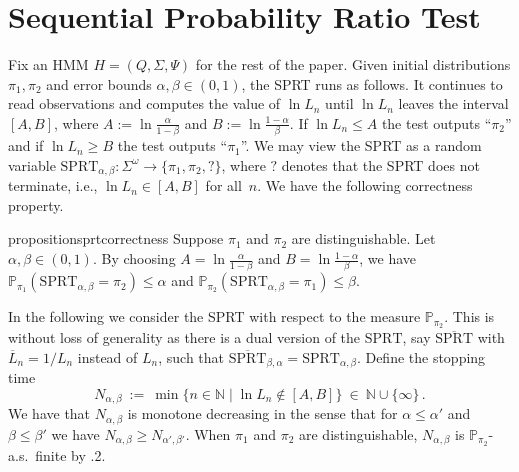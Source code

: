 \documentclass[a4paper,UKenglish,cleveref, autoref,mathscr]{lipics-v2019}
\newcommand{\NN}{\mathbb{N}}
\newcommand{\PP}{\mathbb{P}}
\newcommand{\1}{\mathbbm{1}}
\newcommand{\SPRT}{\mathrm{SPRT}}
\begin{document}
\section{Sequential Probability Ratio Test}\label{liexpsubsect}

Fix an HMM $H = (Q,\Sigma,\Psi)$ for the rest of the paper.
Given initial distributions $\pi_1, \pi_2$ and error bounds $\alpha, \beta \in (0,1)$, the SPRT runs as follows.
It continues to read observations and computes the value of $\ln L_n$ until $\ln L_n$ leaves the interval $[A,B]$, where $A := \ln \frac{\alpha}{1 - \beta}$ and $B := \ln \frac{1 - \alpha}{\beta}$.
If $\ln L_n \leq A$ the test outputs ``$\pi_2$'' and if $\ln L_n \geq B$ the test outputs ``$\pi_1$''.
We may view the SPRT as a random variable $\SPRT_{\alpha, \beta} : \Sigma^\omega \rightarrow \{\pi_1, \pi_2, ?\}$, where $?$ denotes that the SPRT does not terminate, i.e., $\ln L_n \in [A,B]$ for all~$n$.
We have the following correctness property.
\begin{restatable}{proposition}{sprtcorrectness}\label{sprtcorrectness}
Suppose $\pi_1$ and $\pi_2$ are distinguishable.
Let $\alpha, \beta \in (0,1)$.
By choosing $A = \ln \frac{\alpha}{1 - \beta}$ and $B = \ln \frac{1 - \alpha}{\beta}$, we have $\PP_{\pi_1} (\SPRT_{\alpha, \beta} = \pi_2) \leq \alpha$ and $\PP_{\pi_2} (\SPRT_{\alpha, \beta} = \pi_1) \leq \beta$.
\end{restatable}
In the following we consider the SPRT with respect to the measure $\PP_{\pi_2}$.
This is without loss of generality as there is a dual version of the $\SPRT$, say $\overline{\SPRT}$ with $\overline{L}_n = 1/L_n$ instead of $L_n$, such that $ \overline{\SPRT}_{\beta, \alpha} = \SPRT_{\alpha, \beta}$.
%
Define the stopping time
\begin{equation*}
N_{\alpha, \beta} \ := \ \min \{n \in \NN \mid \ln L_n \not\in [A, B]\} \ \in \ \NN \cup \{\infty\}\,.
\end{equation*}
We have that $N_{\alpha, \beta}$ is monotone decreasing in the sense that for $\alpha \leq \alpha'$ and $\beta \leq \beta'$ we have $N_{\alpha, \beta} \geq N_{\alpha', \beta'}$.
When $\pi_1$ and $\pi_2$ are distinguishable, $N_{\alpha, \beta}$ is $\PP_{\pi_2}$-a.s.\ finite by .2.
\end{document}
